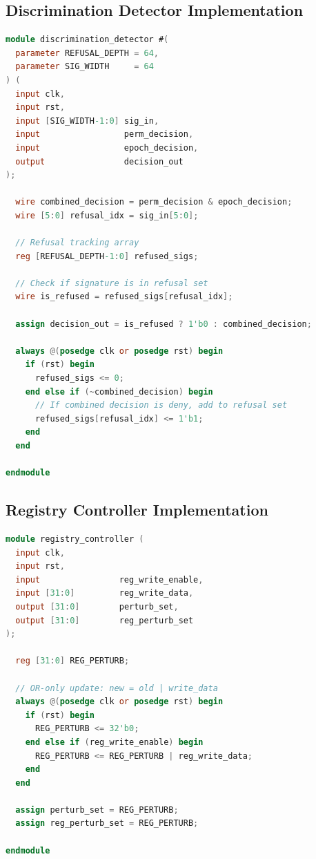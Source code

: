 \documentclass[11pt,oneside]{article}
\begin{document}
\subsection{Discrimination Detector Implementation}

\begin{lstlisting}[language=Verilog]
module discrimination_detector #(
  parameter REFUSAL_DEPTH = 64,
  parameter SIG_WIDTH     = 64
) (
  input clk,
  input rst,
  input [SIG_WIDTH-1:0] sig_in,
  input                 perm_decision,
  input                 epoch_decision,
  output                decision_out
);

  wire combined_decision = perm_decision & epoch_decision;
  wire [5:0] refusal_idx = sig_in[5:0];
  
  // Refusal tracking array
  reg [REFUSAL_DEPTH-1:0] refused_sigs;
  
  // Check if signature is in refusal set
  wire is_refused = refused_sigs[refusal_idx];
  
  assign decision_out = is_refused ? 1'b0 : combined_decision;
  
  always @(posedge clk or posedge rst) begin
    if (rst) begin
      refused_sigs <= 0;
    end else if (~combined_decision) begin
      // If combined decision is deny, add to refusal set
      refused_sigs[refusal_idx] <= 1'b1;
    end
  end

endmodule
\end{lstlisting}

\subsection{Registry Controller Implementation}

\begin{lstlisting}[language=Verilog]
module registry_controller (
  input clk,
  input rst,
  input                reg_write_enable,
  input [31:0]         reg_write_data,
  output [31:0]        perturb_set,
  output [31:0]        reg_perturb_set
);

  reg [31:0] REG_PERTURB;
  
  // OR-only update: new = old | write_data
  always @(posedge clk or posedge rst) begin
    if (rst) begin
      REG_PERTURB <= 32'b0;
    end else if (reg_write_enable) begin
      REG_PERTURB <= REG_PERTURB | reg_write_data;
    end
  end
  
  assign perturb_set = REG_PERTURB;
  assign reg_perturb_set = REG_PERTURB;

endmodule
\end{lstlisting}
\end{document}
